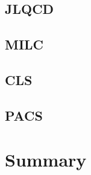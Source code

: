 \documentclass[a4paper,11pt]{article}
\begin{document}
\subsection{JLQCD}

\subsection{MILC}

\subsection{CLS}

\subsection{PACS}

\section{Summary}
\end{document}
